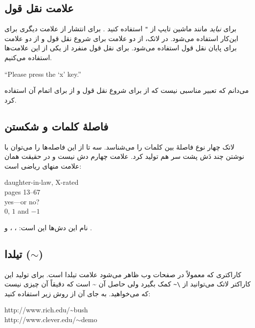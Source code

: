 \subsection{علامت نقل قول}

برای  {\it نباید}
مانند ماشین تایپ از \verb|"| استفاده کنید %
. برای انتشار از علامت دیگری برای این‌کار استفاده می‌شود. در لاتک، از دو علامت    
\lr{\textasciigrave} برای شروع نقل‌ قول و از دو علامت 
\lr{\textquotesingle} برای پایان نقل‌ قول استفاده می‌شود. برای نقل‌ قول منفرد از یکی از این علامت‌ها استفاده می‌کنیم.
\begin{example}
``Please press the `x' key.''
\end{example}

می‌دانم که تعبیر مناسبی نیست که از \lr{\textasciigrave} برای شروع نقل قول و از  \lr{\textquotesingle}  برای اتمام آن استفاده کرد.
\subsection{فاصلهٔ کلمات و شکستن}

لاتک چهار نوع فاصلهٔ بین کلمات را می‌شناسد.  سه تا از این فاصله‌ها را می‌توان با نوشتن چند دَش پشت سر هم تولید کرد. علامت چهارم دش نیست و در حقیقت همان علامت منهای ریاضی است: \romanindex{-}
\romanindex{--} \romanindex{---}  


\begin{example}
daughter-in-law, X-rated\\
pages 13--67\\
yes---or no? \\
$0$, $1$ and $-1$
\end{example}


نام این دش‌ها این است:
، ،  و 
.
\subsection{\texorpdfstring{تیلدا ($\sim$)}{تیلدا}}
کاراکتری که معمولاً در صفحات وب ظاهر می‌شود علامت تیلدا است. برای تولید این کاراکتر لاتک می‌توانید از  \verb|\~| کمک بگیرد ولی حاصل آن  \~{} 
است که دقیقاً آن چیزی نیست که می‌خواهید. به جای آن از روش زیر استفاده کنید:


\begin{example}
http://www.rich.edu/\~{}bush \\
http://www.clever.edu/$\sim$demo
\end{example}
  
